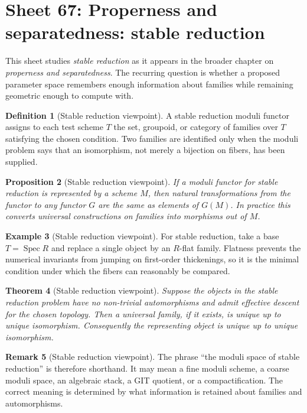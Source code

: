 \documentclass[11pt]{amsart}
\newtheorem{theorem}{Theorem}[section]
\newtheorem{proposition}[theorem]{Proposition}
\theoremstyle{definition}
\newtheorem{definition}[theorem]{Definition}
\newtheorem{example}[theorem]{Example}
\newtheorem{remark}[theorem]{Remark}
\newcommand{\Spec}{\operatorname{Spec}}
\begin{document}
\section{Sheet 67: Properness and separatedness: stable reduction}
This sheet studies \emph{stable reduction} as it appears in the broader chapter on \emph{properness and separatedness}.  The recurring question is whether a proposed parameter space remembers enough information about families while remaining geometric enough to compute with.
\begin{definition}[Stable reduction viewpoint]
A stable reduction moduli functor assigns to each test scheme $T$ the set, groupoid, or category of families over $T$ satisfying the chosen condition.  Two families are identified only when the moduli problem says that an isomorphism, not merely a bijection on fibers, has been supplied.
\end{definition}
\begin{proposition}[Stable reduction viewpoint]
If a moduli functor for stable reduction is represented by a scheme $M$, then natural transformations from the functor to any functor $G$ are the same as elements of $G(M)$.  In practice this converts universal constructions on families into morphisms out of $M$.
\end{proposition}
\begin{example}[Stable reduction viewpoint]
For stable reduction, take a base $T=\Spec R$ and replace a single object by an $R$-flat family.  Flatness prevents the numerical invariants from jumping on first-order thickenings, so it is the minimal condition under which the fibers can reasonably be compared.
\end{example}
\begin{theorem}[Stable reduction viewpoint]
Suppose the objects in the stable reduction problem have no non-trivial automorphisms and admit effective descent for the chosen topology.  Then a universal family, if it exists, is unique up to unique isomorphism.  Consequently the representing object is unique up to unique isomorphism.
\end{theorem}
\begin{remark}[Stable reduction viewpoint]
The phrase ``the moduli space of stable reduction'' is therefore shorthand.  It may mean a fine moduli scheme, a coarse moduli space, an algebraic stack, a GIT quotient, or a compactification.  The correct meaning is determined by what information is retained about families and automorphisms.
\end{remark}
\end{document}
